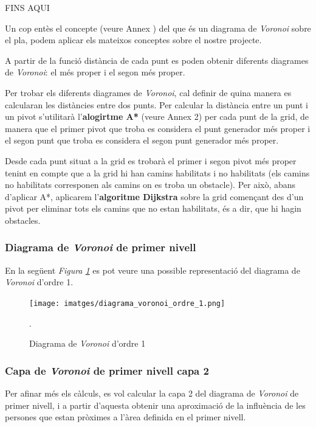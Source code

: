 \documentclass[12pt]{article}
\begin{document}
FINS AQUI

Un cop entès el concepte (veure Annex ) del que és un diagrama de \textit{Voronoi} sobre el pla, podem aplicar els mateixos conceptes sobre el nostre projecte. 

A partir de la funció distància de cada punt es poden obtenir diferents diagrames de \textit{Voronoi}: el més proper i el segon més proper. 

Per trobar els diferents diagrames de \textit{Voronoi}, cal definir de quina manera es calcularan les distàncies entre dos punts. Per calcular la distància entre un punt i un pivot s'utilitarà l'\textbf{alogirtme A*} (veure Annex 2) per cada punt de la grid, de manera que el primer pivot que troba es considera el punt generador més proper i el segon punt que troba es considera el segon punt generador més proper.

Desde cada punt situat a la grid es trobarà el primer i segon pivot més proper tenint en compte que a la grid hi han camins habilitats i no habilitats (els camins no habilitats corresponen als camins on es troba un obstacle). Per això, abans d'aplicar A*, aplicarem l'\textbf{algoritme Dijkstra} sobre la grid començant des d'un pivot per eliminar tots els camins que no estan habilitats, és a dir, que hi hagin obstacles.

\subsubsection{Diagrama de \textit{Voronoi} de primer nivell} 

En la següent \textit{Figura \ref{fig:diagrama_voronoi_ordre_1}} es pot veure una possible representació del diagrama de \textit{Voronoi} d'ordre 1.

\begin{figure}[H]
	\centering
	\texttt{[image: imatges/diagrama\_voronoi\_ordre\_1.png]}\par\vspace{1cm}
	\caption{Diagrama de \textit{Voronoi} d'ordre 1}.
	\label{fig:diagrama_voronoi_ordre_1}
\end{figure}

\subsubsection{Capa de \textit{Voronoi} de primer nivell capa 2}
Per afinar més els càlculs, es vol calcular la capa 2 del diagrama de \textit{Voronoi} de primer nivell, i a partir d'aquesta obtenir una aproximació de la influència de les persones que estan pròximes a l'àrea definida en el primer nivell.
\end{document}
